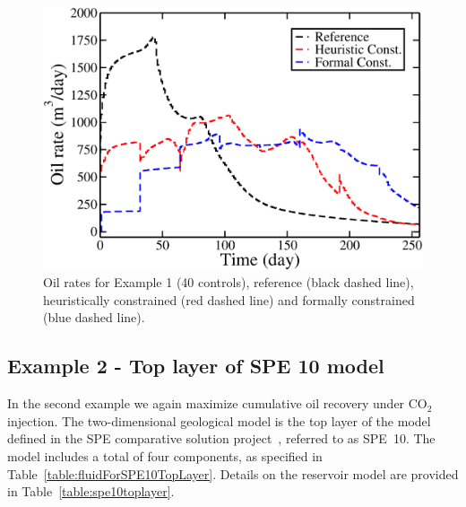 \documentclass[twocolumn,numbook]{svjour3}          %
\begin{document}
\begin{figure}
\begin{center}
\includegraphics[totalheight=2.2in,angle=0]{OilRatesSteps8.pdf}
\end{center}
\caption{Oil rates for Example 1 (40 controls), reference (black dashed line), heuristically constrained (red dashed line)
 and formally constrained (blue dashed line).} 
\label{fig:PIOilRates}
\end{figure}

%





\subsection{Example 2 - Top layer of SPE 10 model}
%
In the second example we again maximize cumulative oil recovery under CO$_2$
injection. The two-dimensional geological model is the top layer of the model
defined in the SPE comparative solution project~\cite{Christie}, referred to as
SPE~10. The model includes a total of four components, as specified in
Table~\ref{table:fluidForSPE10TopLayer}. Details on the
reservoir model are provided in
Table~\ref{table:spe10toplayer}.
\end{document}
